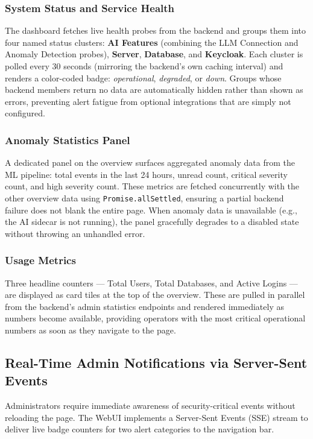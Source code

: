 \subsubsection{System Status and Service Health}
The dashboard fetches live health probes from the backend and groups them into four named status clusters: \textbf{AI Features} (combining the LLM Connection and Anomaly Detection probes), \textbf{Server}, \textbf{Database}, and \textbf{Keycloak}. Each cluster is polled every 30 seconds (mirroring the backend's own caching interval) and renders a color-coded badge: \emph{operational}, \emph{degraded}, or \emph{down}. Groups whose backend members return no data are automatically hidden rather than shown as errors, preventing alert fatigue from optional integrations that are simply not configured.

\subsubsection{Anomaly Statistics Panel}
A dedicated panel on the overview surfaces aggregated anomaly data from the ML pipeline: total events in the last 24 hours, unread count, critical severity count, and high severity count. These metrics are fetched concurrently with the other overview data using \texttt{Promise.allSettled}, ensuring a partial backend failure does not blank the entire page. When anomaly data is unavailable (e.g., the AI sidecar is not running), the panel gracefully degrades to a disabled state without throwing an unhandled error.

\subsubsection{Usage Metrics}
Three headline counters --- Total Users, Total Databases, and Active Logins --- are displayed as card tiles at the top of the overview. These are pulled in parallel from the backend's admin statistics endpoints and rendered immediately as numbers become available, providing operators with the most critical operational numbers as soon as they navigate to the page.


\subsection{Real-Time Admin Notifications via Server-Sent Events}

Administrators require immediate awareness of security-critical events without reloading the page. The WebUI implements a Server-Sent Events (SSE) stream to deliver live badge counters for two alert categories to the navigation bar.

